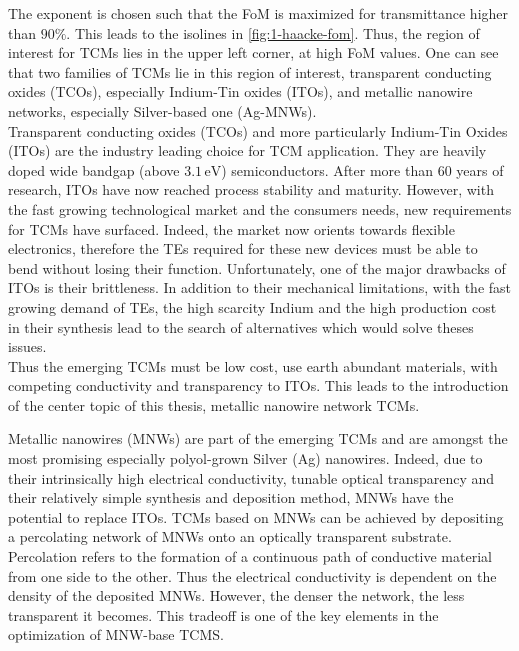     The exponent is chosen such that the FoM is maximized for transmittance higher than $90\%$. This leads to the isolines in \autoref{fig:1-haacke-fom}. Thus, the region of interest for TCMs lies in the upper left corner, at high FoM values. One can see that two families of TCMs lie in this region of interest, transparent conducting oxides (TCOs), especially Indium-Tin oxides (ITOs), and metallic nanowire networks, especially Silver-based one (Ag-MNWs).\\
    Transparent conducting oxides (TCOs) and more particularly Indium-Tin Oxides (ITOs) are the industry leading choice for TCM application. They are heavily doped wide bandgap (above $3.1\,\text{eV}$) semiconductors. After more than 60 years of research, ITOs have now reached process stability and maturity. However, with the fast growing technological market and the consumers needs, new requirements for TCMs have surfaced. Indeed, the market now orients towards flexible electronics, therefore the TEs required for these new devices must be able to bend without losing their function. Unfortunately, one of the major drawbacks of ITOs is their brittleness. In addition to their mechanical limitations, with the fast growing demand of TEs, the high scarcity Indium and the high production cost in their synthesis lead to the search of alternatives which would solve theses issues.\\
    Thus the emerging TCMs must be low cost, use earth abundant materials, with competing conductivity and transparency to ITOs. This leads to the introduction of the center topic of this thesis, metallic nanowire network TCMs.

    Metallic nanowires (MNWs) are part of the emerging TCMs and are amongst the most promising especially polyol-grown Silver (Ag) nanowires. Indeed, due to their intrinsically high electrical conductivity, tunable optical transparency and their relatively simple synthesis and deposition method, MNWs have the potential to replace ITOs. TCMs based on MNWs can be achieved by depositing a percolating network of MNWs onto an optically transparent substrate. Percolation refers to the formation of a continuous path of conductive material from one side to the other. Thus the electrical conductivity is dependent on the density of the deposited MNWs. However, the denser the network, the less transparent it becomes. This tradeoff is one of the key elements in the optimization of MNW-base TCMS.
